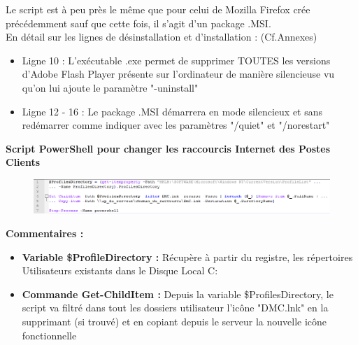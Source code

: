 \documentclass[11pt,a4paper,oneside]{article}
\begin{document}
Le script est à peu près le même que pour celui de Mozilla Firefox crée précédemment sauf que cette fois, il s'agit d'un package .MSI.\\
En détail sur les lignes de désinstallation et d'installation : (Cf.Annexes) \\
\begin{itemize}
\item Ligne 10 : L'exécutable .exe permet de supprimer TOUTES les versions d'Adobe Flash Player présente sur 			l'ordinateur de manière silencieuse vu qu'on lui ajoute le paramètre "-uninstall" \\

\item Ligne 12 - 16 : Le package .MSI démarrera en mode silencieux et sans redémarrer comme indiquer avec les paramètres "/quiet" et "/norestart"
\end{itemize}
\newpage
\textbf{Script PowerShell pour changer les raccourcis Internet des Postes Clients}
\begin{figure}[hbtp]
\centering
\includegraphics[scale=0.6]{Script/Powershell.PNG}
\end{figure}
\textbf{Commentaires :}\\
\begin{itemize}
\item \textbf{Variable \$ProfileDirectory :} Récupère à partir du registre, les répertoires Utilisateurs existants dans le Disque Local C: 
\item \textbf{Commande Get-ChildItem :} Depuis la variable \$ProfilesDirectory, le script va filtré dans tout les dossiers utilisateur l'icône "DMC.lnk" en la supprimant (si trouvé) et en copiant depuis le serveur la nouvelle icône fonctionnelle 
\end{itemize}
\end{document}
